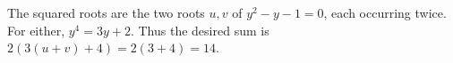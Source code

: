 The squared roots are the two roots $u,v$ of $y^2-y-1=0$, each occurring twice. For either, $y^4=3y+2$. Thus the desired sum is $2(3(u+v)+4)=2(3+4)=\boxed{14}$.
